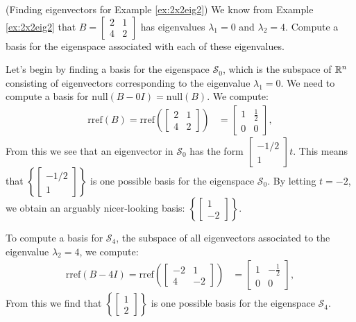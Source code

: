 \documentclass{ximera}
\begin{document}
\begin{example}\label{ex:eigvectors2x2eig2} (Finding eigenvectors for Example \ref{ex:2x2eig2}) 
We know from Example \ref{ex:2x2eig2} that $B=\begin{bmatrix} 2& 1\\ 4&2
\end{bmatrix}$ has eigenvalues $\lambda_1=0$ and $\lambda_2=4$.  Compute a basis for the eigenspace associated with each of these eigenvalues.
\begin{explanation}
Let's begin by finding a basis for the eigenspace $\mathcal{S}_0$, which is the subspace of $\mathbb{R}^n$ consisting of eigenvectors corresponding to the eigenvalue $\lambda_1=0$.  We need to compute a basis for $\mbox{null}(B-0I) = \mbox{null}(B)$.  We compute:
\begin{align*}\mbox{rref}(B)=\mbox{rref}\left(\begin{bmatrix}2&1\\4&2\end{bmatrix}\right)&=\begin{bmatrix}1&\frac{1}{2}\\0&0\end{bmatrix},
\end{align*}
From this we see that an eigenvector in $\mathcal{S}_0$ has the form $\begin{bmatrix}-1/2\\1\end{bmatrix}t$. %
This means that $\left\{\begin{bmatrix}-1/2\\1\end{bmatrix}\right\}$ is one possible basis for the eigenspace $\mathcal{S}_0$.  By letting $t=-2$, we obtain an arguably nicer-looking basis: $\left\{\begin{bmatrix}1\\-2\end{bmatrix}\right\}$. 

To compute a basis for $\mathcal{S}_4$, the subspace of all eigenvectors associated to the eigenvalue $\lambda_2=4$, we compute:
\begin{align*}\mbox{rref}(B-4I)=\mbox{rref}\left(\begin{bmatrix}-2&1\\4&-2\end{bmatrix}\right)&=\begin{bmatrix}1&-\frac{1}{2}\\0&0\end{bmatrix},
\end{align*}
From this we find that $\left\{\begin{bmatrix}1\\2\end{bmatrix}\right\}$ is one possible basis for the eigenspace $\mathcal{S}_4$.
\end{explanation}
\end{example}
\end{document}
